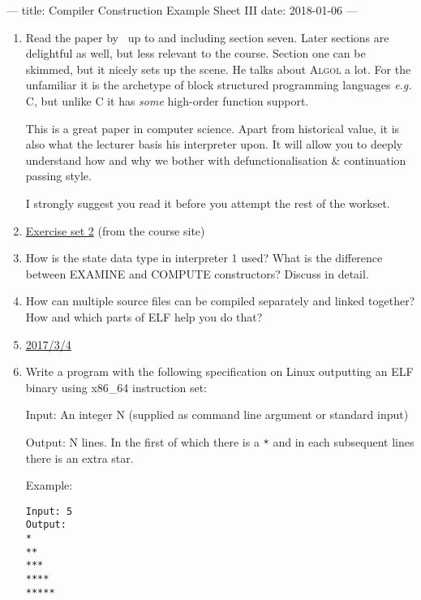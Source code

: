 ---
title: Compiler Construction Example Sheet III
date: 2018-01-06
---



\begin{enumerate}
  \item Read the paper by~\citet{reynolds1972definitional} up to and including
    section seven. Later sections are delightful as well, but less relevant to
    the course. Section one can be skimmed, but it nicely sets up the scene. He
    talks about \textsc{Algol} a lot. For the unfamiliar it is the archetype of
    block structured programming languages \emph{e.g.} \textsc{C}, but unlike
    \textsc{C} it has \emph{some} high-order function support.

    This is a great paper in computer science. Apart from historical value, it
    is also what the lecturer basis his interpreter upon. It will allow you to
    deeply understand how and why we bother with defunctionalisation \&
    continuation passing style.

    I strongly suggest you read it before you attempt the rest of the workset.

  \item
    \href{https://www.cl.cam.ac.uk/teaching/current/CompConstr/Exercises_Set_2.ml}{Exercise
    set 2} (from the course site)

  \item How is the state data type in interpreter 1 used? What is the
    difference between EXAMINE and COMPUTE constructors? Discuss in detail.

  \item How can multiple source files can be compiled separately and linked
    together? How and which parts of ELF help you do that?

  \item \href{http://www.cl.cam.ac.uk/teaching/exams/pastpapers/y2017p23q4.pdf}{2017/3/4}

  \item Write a program with the following specification on Linux outputting an
    ELF binary using x86\_64 instruction set:

    Input: An integer N (supplied as command line argument or standard input)

    Output: N lines. In the first of which there is a \texttt{*} and in each
    subsequent lines there is an extra star.

    Example:
    \begin{verbatim}
Input: 5
Output:
*
**
***
****
*****
    \end{verbatim}

\end{enumerate}


